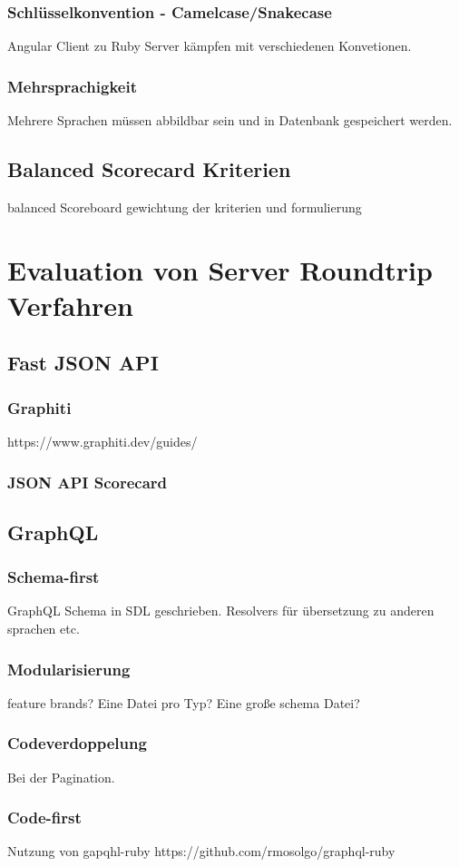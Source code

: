 \subsection{Schlüsselkonvention - Camelcase/Snakecase}
Angular Client zu Ruby Server kämpfen mit verschiedenen Konvetionen.
\subsection{Mehrsprachigkeit}
Mehrere Sprachen müssen abbildbar sein und in Datenbank gespeichert werden.
\section{Balanced Scorecard Kriterien}
balanced Scoreboard gewichtung der kriterien und formulierung
\chapter{Evaluation von Server Roundtrip Verfahren}

\section{Fast JSON API}
\subsection{Graphiti}
https://www.graphiti.dev/guides/
\subsection{JSON API Scorecard}
\section{GraphQL}
\subsection{Schema-first}
GraphQL Schema in SDL geschrieben. Resolvers für übersetzung zu anderen sprachen etc.
\subsection{Modularisierung}
feature brands?
Eine Datei pro Typ?
Eine große schema Datei?
\subsection{Codeverdoppelung}
Bei der Pagination.
\subsection{Code-first}
Nutzung von gapqhl-ruby
https://github.com/rmosolgo/graphql-ruby
